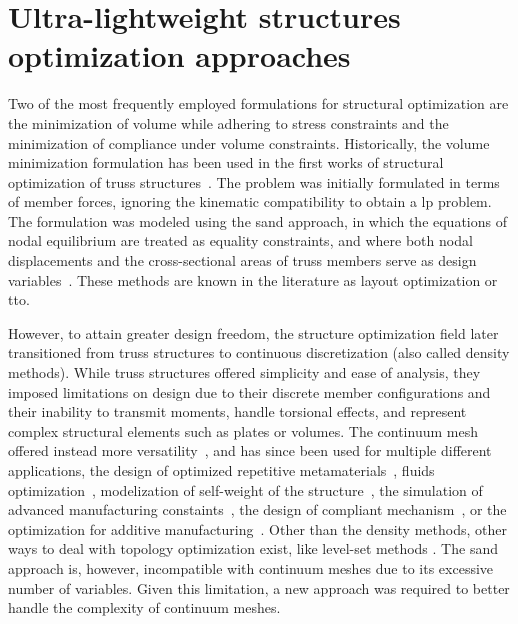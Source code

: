 \section{Ultra-lightweight structures optimization approaches}
Two of the most frequently employed formulations for structural optimization are the minimization of volume while adhering to stress constraints and the minimization of compliance under volume constraints. Historically, the volume minimization formulation has been used in the first works of structural optimization of truss structures~. The problem was initially formulated in terms of member forces, ignoring the kinematic compatibility to obtain a \gls{lp} problem. The formulation was modeled using the \gls{sand} approach, in which the equations of nodal equilibrium are treated as equality constraints, and where both nodal displacements and the cross-sectional areas of truss members serve as design variables~. These methods are known in the literature as layout optimization or \gls{tto}. 

However, to attain greater design freedom, the structure optimization field later transitioned from truss structures to continuous discretization (also called density methods). While truss structures offered simplicity and ease of analysis, they imposed limitations on design due to their discrete member configurations and their inability to transmit moments, handle torsional effects, and represent complex structural elements such as plates or volumes. The continuum mesh offered instead more versatility~, and has since been used for multiple different applications, \eg the design of optimized repetitive metamaterials~, fluids optimization~, modelization of self-weight of the structure~, the simulation of advanced manufacturing constaints~, the design of compliant mechanism~, or the optimization for additive manufacturing~. Other than the density methods, other ways to deal with topology optimization exist, like level-set methods . The \gls{sand} approach is, however, incompatible with continuum meshes due to its excessive number of variables. Given this limitation, a new approach was required to better handle the complexity of continuum meshes.

